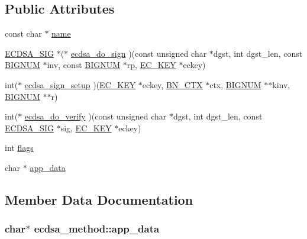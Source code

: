 \subsection*{Public Attributes}
\begin{DoxyCompactItemize}
\item 
const char $\ast$ \hyperlink{structecdsa__method_a350be654639d79dcf73933de20378c39}{name}
\item 
\hyperlink{ecdsa_8h_a6b7e6f59c093d0f4f501d5b55c8eb5c6}{E\+C\+D\+S\+A\+\_\+\+S\+IG} $\ast$($\ast$ \hyperlink{structecdsa__method_ab3ecb28fb054cca5704a67fc40ffe5c7}{ecdsa\+\_\+do\+\_\+sign} )(const unsigned char $\ast$dgst, int dgst\+\_\+len, const \hyperlink{ossl__typ_8h_a6fb19728907ec6515e4bfb716bffa141}{B\+I\+G\+N\+UM} $\ast$inv, const \hyperlink{ossl__typ_8h_a6fb19728907ec6515e4bfb716bffa141}{B\+I\+G\+N\+UM} $\ast$rp, \hyperlink{ec_8h_a756878ae60b2fc17d4217e77ffe5e0d3}{E\+C\+\_\+\+K\+EY} $\ast$eckey)
\item 
int($\ast$ \hyperlink{structecdsa__method_a4d80e5379f44922ff30c9843d6833e5c}{ecdsa\+\_\+sign\+\_\+setup} )(\hyperlink{ec_8h_a756878ae60b2fc17d4217e77ffe5e0d3}{E\+C\+\_\+\+K\+EY} $\ast$eckey, \hyperlink{ossl__typ_8h_a0b235a35b7dd7922c097571ecd90e2bc}{B\+N\+\_\+\+C\+TX} $\ast$ctx, \hyperlink{ossl__typ_8h_a6fb19728907ec6515e4bfb716bffa141}{B\+I\+G\+N\+UM} $\ast$$\ast$kinv, \hyperlink{ossl__typ_8h_a6fb19728907ec6515e4bfb716bffa141}{B\+I\+G\+N\+UM} $\ast$$\ast$r)
\item 
int($\ast$ \hyperlink{structecdsa__method_ad90c7a028980ae216584c7a41bd2da83}{ecdsa\+\_\+do\+\_\+verify} )(const unsigned char $\ast$dgst, int dgst\+\_\+len, const \hyperlink{ecdsa_8h_a6b7e6f59c093d0f4f501d5b55c8eb5c6}{E\+C\+D\+S\+A\+\_\+\+S\+IG} $\ast$sig, \hyperlink{ec_8h_a756878ae60b2fc17d4217e77ffe5e0d3}{E\+C\+\_\+\+K\+EY} $\ast$eckey)
\item 
int \hyperlink{structecdsa__method_a5be789616b55be45d3898bcbde0affe9}{flags}
\item 
char $\ast$ \hyperlink{structecdsa__method_af79ef8a1ee895948f6ba2de8cfb8d145}{app\+\_\+data}
\end{DoxyCompactItemize}


\subsection{Member Data Documentation}
\subsubsection[{\texorpdfstring{app\+\_\+data}{app_data}}]{\setlength{\rightskip}{0pt plus 5cm}char$\ast$ ecdsa\+\_\+method\+::app\+\_\+data}\hypertarget{structecdsa__method_af79ef8a1ee895948f6ba2de8cfb8d145}{}\label{structecdsa__method_af79ef8a1ee895948f6ba2de8cfb8d145}

